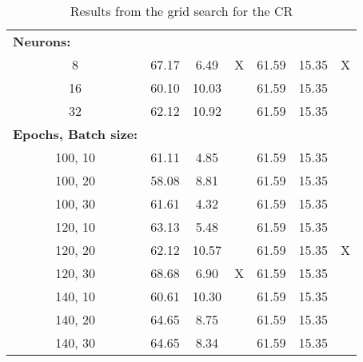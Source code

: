 \documentclass[12pt,a4paper]{article}
\begin{document}
\begin{table}[]
\begin{tabular}{ccccccc}
\multicolumn{1}{l}{\textbf{Neurons:}} &  &  &  &  &  &  \\
8        		& 67.17    	& 6.49    & X      & 61.59     & 15.35    & X     \\
16              & 60.10     & 10.03   &        & 61.59     & 15.35    &       \\
32              & 62.12     & 10.92   &        & 61.59     & 15.35    &       \\ \hline
\multicolumn{1}{l}{\textbf{Epochs, Batch size:}}  &  &  &  &  &  &   \\
100, 10         & 61.11     & 4.85   &        & 61.59     & 15.35    &       \\
100, 20         & 58.08     & 8.81   &        & 61.59     & 15.35    &       \\
100, 30         & 61.61     & 4.32   &        & 61.59     & 15.35    &       \\
120, 10         & 63.13     & 5.48   &        & 61.59     & 15.35    &       \\
120, 20         & 62.12     & 10.57  &        & 61.59     & 15.35    & X     \\
120, 30         & 68.68     & 6.90   & X      & 61.59     & 15.35    &       \\
140, 10         & 60.61     & 10.30  &        & 61.59     & 15.35    &       \\
140, 20         & 64.65     & 8.75   &        & 61.59     & 15.35    &       \\
140, 30         & 64.65     & 8.34   &        & 61.59     & 15.35    &       \\ \hline
\end{tabular}
\caption{Results from the grid search for the CR}
\label{tab:GridCombined}
\end{table}
\end{document}
